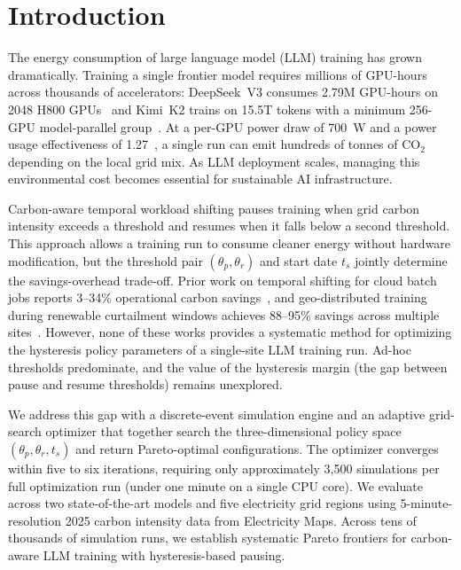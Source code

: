 
\chapter{Introduction}
\label{sec:introduction}

The energy consumption of large language model (LLM) training has grown
dramatically. Training a single frontier model requires millions of GPU-hours
across thousands of accelerators: DeepSeek~V3 consumes 2.79M GPU-hours on 2048
H800 GPUs~\cite{deepseek-ai_deepseek-v3_2024} and Kimi~K2 trains on 15.5T
tokens with a minimum 256-GPU model-parallel group~\cite{kimi_team_kimi_2025}.
At a per-GPU power draw of 700~W and a power usage effectiveness of
1.27~\cite{jegham_hungry_2025}, a single run can emit hundreds of tonnes of
CO$_2$ depending on the local grid mix. As LLM deployment scales, managing
this environmental cost becomes essential for sustainable AI infrastructure.

Carbon-aware temporal workload shifting pauses training when grid carbon
intensity exceeds a threshold and resumes when it falls below a second
threshold. This approach allows a training run to consume cleaner energy
without hardware modification, but the threshold pair $(\theta_p, \theta_r)$
and start date $t_s$ jointly determine the savings-overhead trade-off. Prior
work on temporal shifting for cloud batch jobs reports 3--34\% operational
carbon savings~\cite{wiesner_lets_2021}, and geo-distributed training during
renewable curtailment windows achieves 88--95\% savings across multiple
sites~\cite{wiesner_distributed_2026}. However, none of these works provides a
systematic method for optimizing the hysteresis policy parameters of a
single-site LLM training run. Ad-hoc thresholds predominate, and the value of
the hysteresis margin (the gap between pause and resume thresholds) remains
unexplored.

We address this gap with a discrete-event simulation engine and an adaptive
grid-search optimizer that together search the three-dimensional policy space
$(\theta_p, \theta_r, t_s)$ and return Pareto-optimal configurations. The
optimizer converges within five to six iterations, requiring only
approximately 3,500 simulations per full optimization run (under one minute on
a single CPU core). We evaluate across two state-of-the-art models and five
electricity grid regions using 5-minute-resolution 2025 carbon intensity data
from Electricity Maps. Across tens of thousands of simulation runs, we
establish systematic Pareto frontiers for carbon-aware LLM training with
hysteresis-based pausing.

